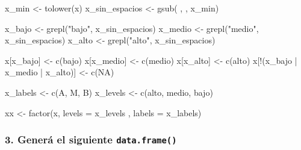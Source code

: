 \documentclass[
]{article}
\newenvironment{Shaded}{\begin{snugshade}}{\end{snugshade}}
\newcommand{\AttributeTok}[1]{\textcolor[rgb]{0.77,0.63,0.00}{#1}}
\newcommand{\ConstantTok}[1]{\textcolor[rgb]{0.00,0.00,0.00}{#1}}
\newcommand{\FunctionTok}[1]{\textcolor[rgb]{0.00,0.00,0.00}{#1}}
\newcommand{\NormalTok}[1]{#1}
\newcommand{\OtherTok}[1]{\textcolor[rgb]{0.56,0.35,0.01}{#1}}
\newcommand{\SpecialCharTok}[1]{\textcolor[rgb]{0.00,0.00,0.00}{#1}}
\newcommand{\StringTok}[1]{\textcolor[rgb]{0.31,0.60,0.02}{#1}}
\begin{document}
\begin{Shaded}
\begin{Highlighting}[]
\NormalTok{x\_min }\OtherTok{\textless{}{-}} \FunctionTok{tolower}\NormalTok{(x)}
\NormalTok{x\_sin\_espacios }\OtherTok{\textless{}{-}} \FunctionTok{gsub}\NormalTok{(}\StringTok{\textquotesingle{} \textquotesingle{}}\NormalTok{, }\StringTok{\textquotesingle{}\textquotesingle{}}\NormalTok{, x\_min)}

\NormalTok{x\_bajo }\OtherTok{\textless{}{-}} \FunctionTok{grepl}\NormalTok{(}\StringTok{"bajo"}\NormalTok{, x\_sin\_espacios)}
\NormalTok{x\_medio }\OtherTok{\textless{}{-}} \FunctionTok{grepl}\NormalTok{(}\StringTok{"medio"}\NormalTok{, x\_sin\_espacios)}
\NormalTok{x\_alto }\OtherTok{\textless{}{-}} \FunctionTok{grepl}\NormalTok{(}\StringTok{"alto"}\NormalTok{, x\_sin\_espacios)}

\NormalTok{x[x\_bajo] }\OtherTok{\textless{}{-}} \FunctionTok{c}\NormalTok{(}\StringTok{\textquotesingle{}bajo\textquotesingle{}}\NormalTok{)}
\NormalTok{x[x\_medio] }\OtherTok{\textless{}{-}} \FunctionTok{c}\NormalTok{(}\StringTok{\textquotesingle{}medio\textquotesingle{}}\NormalTok{)}
\NormalTok{x[x\_alto] }\OtherTok{\textless{}{-}} \FunctionTok{c}\NormalTok{(}\StringTok{\textquotesingle{}alto\textquotesingle{}}\NormalTok{)}
\NormalTok{x[}\SpecialCharTok{!}\NormalTok{(x\_bajo }\SpecialCharTok{|}\NormalTok{ x\_medio }\SpecialCharTok{|}\NormalTok{ x\_alto)] }\OtherTok{\textless{}{-}} \FunctionTok{c}\NormalTok{(}\ConstantTok{NA}\NormalTok{)}


\NormalTok{x\_labels }\OtherTok{\textless{}{-}} \FunctionTok{c}\NormalTok{(}\StringTok{\textquotesingle{}A\textquotesingle{}}\NormalTok{, }\StringTok{\textquotesingle{}M\textquotesingle{}}\NormalTok{, }\StringTok{\textquotesingle{}B\textquotesingle{}}\NormalTok{)}
\NormalTok{x\_levels }\OtherTok{\textless{}{-}} \FunctionTok{c}\NormalTok{(}\StringTok{\textquotesingle{}alto\textquotesingle{}}\NormalTok{, }\StringTok{\textquotesingle{}medio\textquotesingle{}}\NormalTok{, }\StringTok{\textquotesingle{}bajo\textquotesingle{}}\NormalTok{)}

\NormalTok{xx }\OtherTok{\textless{}{-}} \FunctionTok{factor}\NormalTok{(x, }\AttributeTok{levels =}\NormalTok{ x\_levels , }\AttributeTok{labels =}\NormalTok{ x\_labels)}
\end{Highlighting}
\end{Shaded}

\hypertarget{generuxe1-el-siguiente-data.frame}{%
\subsubsection{\texorpdfstring{3. Generá el siguiente
\texttt{data.frame()}}{3. Generá el siguiente data.frame()}}\label{generuxe1-el-siguiente-data.frame}}
\end{document}
